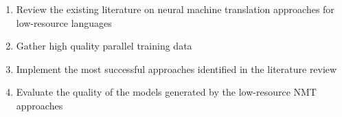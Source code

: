 \begin{enumerate}
  \item Review the existing literature on neural machine translation approaches for low-resource languages
  \item Gather high quality parallel training data
  \item Implement the most successful approaches identified in the literature review
  \item Evaluate the quality of the models generated by the low-resource NMT approaches
\end{enumerate}
